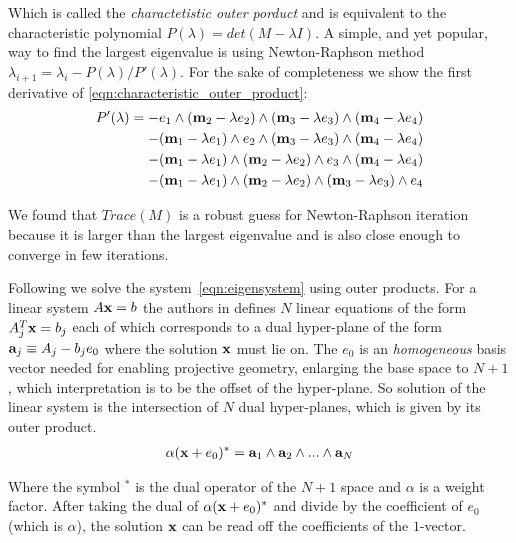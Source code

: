 \documentclass{birkjour}
\numberwithin{equation}{section}
\begin{document}
Which is called the \emph{charactetistic outer porduct} and is equivalent to the characteristic polynomial $P(\lambda) = det(M - \lambda I)$. A simple, and yet popular, way to find the largest eigenvalue is using Newton-Raphson method $\lambda_{i+1} = \lambda_i - P(\lambda) / P'(\lambda)$. For the sake of completeness we show the first derivative of \ref{eqn:characteristic_outer_product}:
\begin{eqnarray*}
P'(\lambda) = 
- e_1\wedge(\textbf m_2 - \lambda e_2)\wedge(\textbf m_3 - \lambda e_3)\wedge(\textbf m_4- \lambda e_4)\\
- (\textbf m_1 - \lambda e_1)\wedge e_2\wedge(\textbf m_3 - \lambda e_3)\wedge(\textbf m_4- \lambda e_4)\\
- (\textbf m_1 - \lambda e_1)\wedge(\textbf m_2 - \lambda e_2)\wedge e_3\wedge(\textbf m_4- \lambda e_4)\\
- (\textbf m_1 - \lambda e_1)\wedge(\textbf m_2 - \lambda e_2)\wedge(\textbf m_3 - \lambda e_3)\wedge e_4
\end{eqnarray*}

We found that $Trace(M)$ is a robust guess for Newton-Raphson iteration because it is larger than the largest eigenvalue and is also close enough to converge in few iterations.

Following \cite{DeKeninck2019} we solve the system~\ref{eqn:eigensystem} using outer products. For a linear system $A \textbf x = b$ the authors in \cite{DeKeninck2019} defines $N$ linear equations of the form $A^T_j \textbf x = b_j$ each of which corresponds to a dual hyper-plane of the form $\textbf a_j \equiv A_j - b_j e_0$ where the solution $\textbf x$ must lie on. The $e_0$ is an \emph{homogeneous} basis vector needed for enabling projective geometry, enlarging the base space to $N+1$, which interpretation is to be the offset of the hyper-plane. So solution of the linear system is the intersection of $N$ dual hyper-planes, which is given by its outer product.
\begin{eqnarray}
\alpha (\textbf x + e_0)^* = \textbf a_1 \wedge \textbf a_2 \wedge ... \wedge \textbf a_N
\end{eqnarray}

Where the symbol $^*$ is the dual operator of the $N+1$ space and $\alpha$ is a weight factor. After taking the dual of $\alpha (\textbf x + e_0)^*$ and divide by the coefficient of $e_0$ (which is $\alpha$), the solution $\textbf x$ can be read off the coefficients of the $1$-vector.
\end{document}
